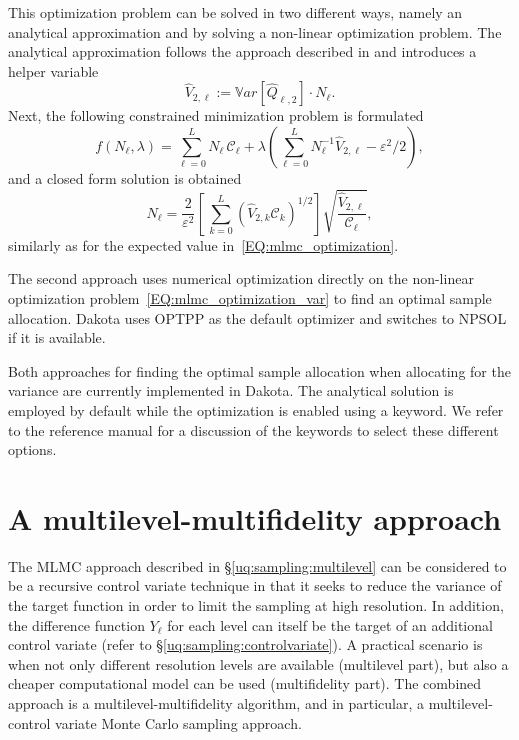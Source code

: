 This optimization problem can be solved in two different ways, namely an analytical approximation and by solving a non-linear optimization problem. The analytical approximation follows the approach described in \cite{Pisaroni2017} and introduces a helper variable
\begin{equation}
\hat{V}_{2, \ell} := \mathbb{V}ar\left[ \hat{Q}_{\ell,2} \right] \cdot N_{\ell}.
\end{equation}
Next, the following constrained minimization problem is formulated
\begin{equation}\label{EQ:mlmc_var_optimization_nobile}
 f(N_\ell,\lambda) = \sum_{\ell=0}^{L} N_\ell \, \mathcal{C}_{\ell} 
                   + \lambda \left( \sum_{\ell=0}^{L} N_\ell^{-1} \hat{V}_{2, \ell} - \varepsilon^2/2 \right),
\end{equation}
and a closed form solution is obtained
\begin{equation}\label{EQ: MLMC_nl_var_nobile}
N_{\ell} = \frac{2}{\varepsilon^2} \left[ \, \sum_{k=0}^L \left( \hat{V}_{2, k} \mathcal{C}_k \right)^{1/2} \right] 
               \sqrt{\frac{ \hat{V}_{2, \ell} }{\mathcal{C}_{\ell}}},
\end{equation}
similarly as for the expected value in~\eqref{EQ:mlmc_optimization}.

The second approach uses numerical optimization directly on the non-linear optimization problem~\eqref{EQ:mlmc_optimization_var} to find an optimal sample allocation. Dakota uses OPTPP as the default optimizer and switches to NPSOL if it is available. 

Both approaches for finding the optimal sample allocation when allocating for the variance are currently implemented in Dakota. The analytical solution is employed by default while the optimization is enabled using a keyword. We refer to the reference manual for a discussion of the keywords to select these different options.


\section{A multilevel-multifidelity approach} \label{uq:sampling:mlmf}

The MLMC approach described in \S\ref{uq:sampling:multilevel} can be considered
to be a recursive control variate technique in that it seeks to reduce
the variance of the target function in order to limit the sampling at
high resolution. In addition, the difference function $Y_\ell$ for
each level can itself be the target of an additional control variate
(refer to \S\ref{uq:sampling:controlvariate}). A practical scenario is
when not only different resolution levels are available (multilevel
part), but also a cheaper computational model can be used
(multifidelity part). The combined approach is a
multilevel-multifidelity algorithm, and in particular, a
multilevel-control variate Monte Carlo sampling approach.

